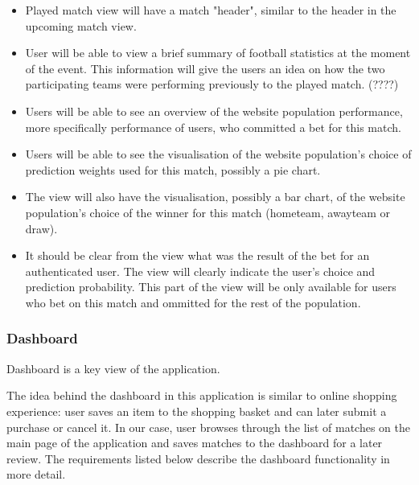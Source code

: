 \begin{itemize}
	\item Played match view will have a match "header", similar to the header in the upcoming match view.
	\item User will be able to view a brief summary of football statistics  at the moment of the event. This information will give the users an idea on how the two participating teams were performing previously to the played match. (????)
	\item Users will be able to see an overview of the website population performance, more specifically performance of users, who committed a bet for this match.
	\item Users will be able to see the visualisation of the website population's choice of prediction weights used for this match, possibly a pie chart.
	\item The view will also have the visualisation, possibly a bar chart, of the website population's choice of the winner for this match (hometeam, awayteam or draw). 
	\item It should be clear from the view what was the result of the bet for an authenticated user. The view will clearly indicate the user's choice and prediction probability. This part of the view will be only available for users who bet on this match and ommitted for the rest of the population. 
\end{itemize}

\subsubsection{Dashboard}
\label{subsubsec:dashboard_req}
Dashboard is a key view of the application.

The idea behind the dashboard in this application is similar to online shopping experience: user saves an item to the shopping basket and can later submit a purchase or cancel it. In our case, user browses through the list of matches on the main page of the application and saves matches to the dashboard for a later review. The requirements listed below describe the dashboard functionality in more detail.

